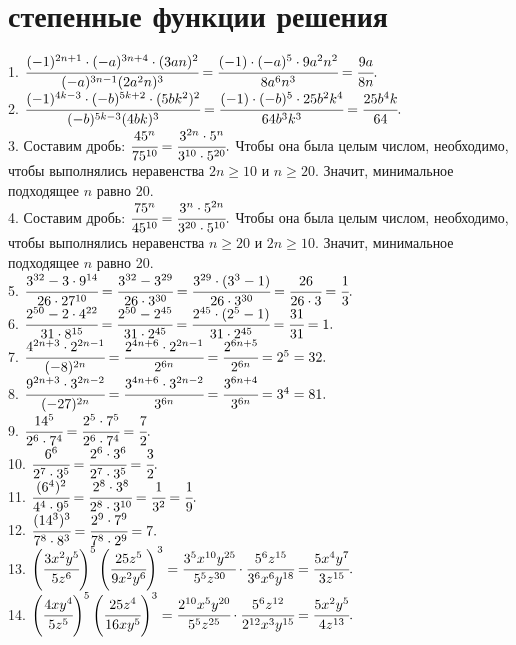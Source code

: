 \documentclass[12pt]{article}
\begin{document}
\section{степенные функции решения}
1. $\cfrac{(-1)^{2n+1}\cdot(-a)^{3n+4}\cdot(3an)^2}{(-a)^{3n-1}(2a^2n)^3}=
\cfrac{(-1)\cdot(-a)^{5}\cdot9a^2n^2}{8a^6n^3}=\cfrac{9a}{8n}.$\\
2. $\cfrac{(-1)^{4k-3}\cdot(-b)^{5k+2}\cdot(5bk^2)^2}{(-b)^{5k-3}(4bk)^3}=
\cfrac{(-1)\cdot(-b)^{5}\cdot25b^2k^4}{64b^3k^3}=\cfrac{25b^4k}{64}.$\\
3. Составим дробь: $\cfrac{45^n}{75^{10}}=\cfrac{3^{2n}\cdot5^n}{3^{10}\cdot5^{20}}.$ Чтобы она была целым числом, необходимо, чтобы выполнялись неравенства $2n\geqslant10$ и $n\geqslant20.$ Значит, минимальное подходящее $n$ равно 20.\\
4. Составим дробь: $\cfrac{75^n}{45^{10}}=\cfrac{3^{n}\cdot5^{2n}}{3^{20}\cdot5^{10}}.$ Чтобы она была целым числом, необходимо, чтобы выполнялись неравенства $n\geqslant20$ и $2n\geqslant10.$ Значит, минимальное подходящее $n$ равно 20.\\
5. $\cfrac{3^{32}-3\cdot 9^{14}}{26\cdot27^{10}}=\cfrac{3^{32}-3^{29}}{26\cdot3^{30}}=\cfrac{3^{29}\cdot(3^3-1)}{26\cdot3^{30}}=\cfrac{26}{26\cdot3}=\cfrac{1}{3}.$\\
6. $\cfrac{2^{50}-2\cdot4^{22}}{31\cdot8^{15}}=\cfrac{2^{50}-2^{45}}{31\cdot2^{45}}=\cfrac{2^{45}\cdot(2^5-1)}{31\cdot2^{45}}=\cfrac{31}{31}=1.$\\
7. $\cfrac{4^{2n+3}\cdot 2^{2n-1}}{(-8)^{2n}}=\cfrac{2^{4n+6}\cdot 2^{2n-1}}{2^{6n}}=\cfrac{2^{6n+5}}{2^{6n}}=2^5=32.$\\
8. $\cfrac{9^{2n+3}\cdot3^{2n-2}}{(-27)^{2n}}=\cfrac{3^{4n+6}\cdot3^{2n-2}}{3^{6n}}=\cfrac{3^{6n+4}}{3^{6n}}=3^4=81.$\\
9. $\cfrac{14^5}{2^6\cdot 7^4}=\cfrac{2^5\cdot7^5}{2^6\cdot 7^4}=\cfrac{7}{2}.$\\
10. $\cfrac{6^6}{2^7\cdot 3^5}=\cfrac{2^6\cdot3^6}{2^7\cdot 3^5}=\cfrac{3}{2}.$\\
11. $\cfrac{(6^4)^2}{4^4\cdot9^5}=\cfrac{2^8\cdot3^8}{2^8\cdot3^{10}}=\cfrac{1}{3^2}=\cfrac{1}{9}.$\\
12. $\cfrac{(14^3)^3}{7^8\cdot8^3}=\cfrac{2^9\cdot7^9}{7^8\cdot2^9}=7.$\\
13. $\left(\cfrac{3x^2y^5}{5z^6}\right)^5\left(\cfrac{25z^5}{9x^2y^6}\right)^3=\cfrac{3^5x^{10}y^{25}}{5^5z^{30}}\cdot\cfrac{5^6z^{15}}{3^6x^6y^{18}}=\cfrac{5x^4y^7}{3z^{15}}.$\\
14. $\left(\cfrac{4xy^4}{5z^5}\right)^5\left(\cfrac{25z^4}{16xy^5}\right)^3=\cfrac{2^{10}x^5y^{20}}{5^5z^{25}}\cdot\cfrac{5^6z^{12}}{2^{12}x^3y^{15}}=\cfrac{5x^2y^5}{4z^{13}}.$\\
\end{document}
